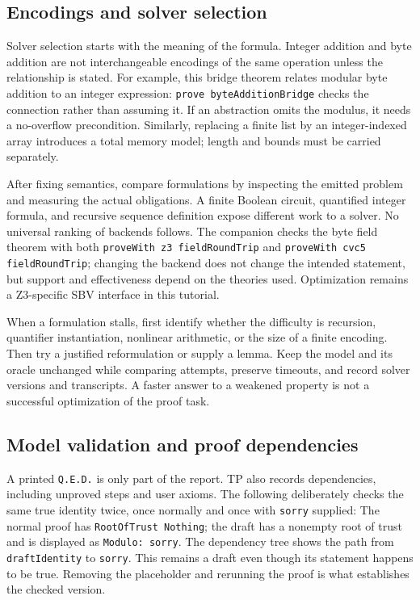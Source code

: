 \documentclass[review]{jfp-epi}
\newcommand{\code}[1]{\texttt{#1}}
\begin{document}
\subsection{Encodings and solver selection}
\label{sec:encodings-and-solvers}

Solver selection starts with the meaning of the formula. Integer addition and
byte addition are not interchangeable encodings of the same operation unless
the relationship is stated. For example, this bridge theorem relates modular
byte addition to an integer expression:
\code{prove byteAdditionBridge} checks the connection rather than assuming it.
If an abstraction omits the modulus, it needs a no-overflow precondition.
Similarly, replacing a finite list by an integer-indexed array introduces a
total memory model; length and bounds must be carried separately.

After fixing semantics, compare formulations by inspecting the emitted problem
and measuring the actual obligations. A finite Boolean circuit, quantified
integer formula, and recursive sequence definition expose different work to a
solver. No universal ranking of backends follows. The companion checks the byte
field theorem with both \code{proveWith z3 fieldRoundTrip} and
\code{proveWith cvc5 fieldRoundTrip}; changing the backend does not change the
intended statement, but support and effectiveness depend on the theories used.
Optimization remains a Z3-specific SBV interface in this tutorial.

When a formulation stalls, first identify whether the difficulty is recursion,
quantifier instantiation, nonlinear arithmetic, or the size of a finite encoding.
Then try a justified reformulation or supply a lemma. Keep the model and its
oracle unchanged while comparing attempts, preserve timeouts, and record solver
versions and transcripts. A faster answer to a weakened property is not a
successful optimization of the proof task.


\subsection{Model validation and proof dependencies}
\label{sec:proof-audits}

A printed \code{Q.E.D.} is only part of the report. TP also records dependencies,
including unproved steps and user axioms. The following deliberately checks the
same true identity twice, once normally and once with \code{sorry} supplied:
The normal proof has \code{RootOfTrust Nothing}; the draft has a nonempty root
of trust and is displayed as \code{Modulo: sorry}. The dependency tree shows the
path from \code{draftIdentity} to \code{sorry}. This remains a draft even though
its statement happens to be true. Removing the placeholder and rerunning the
proof is what establishes the checked version.
\end{document}
